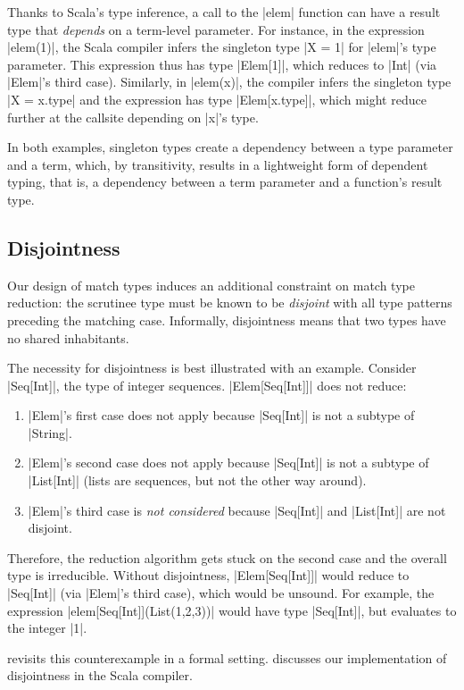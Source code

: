 Thanks to Scala's type inference, a call to the |elem| function can have a result type that \emph{depends} on a term-level parameter.
For instance, in the expression |elem(1)|, the Scala compiler infers the singleton type |X = 1| for |elem|'s type parameter.
This expression thus has type |Elem[1]|, which reduces to |Int| (via |Elem|'s third case).
Similarly, in |elem(x)|, the compiler infers the singleton type |X = x.type| and the expression has type |Elem[x.type]|, which might reduce further at the callsite depending on |x|'s type.

In both examples, singleton types create a dependency between a type parameter and a term, which, by transitivity, results in a lightweight form of dependent typing, that is, a dependency between a term parameter and a function's result type.

\subsection{Disjointness}
Our design of match types induces an additional constraint on match type reduction: the scrutinee type must be known to be \emph{disjoint} with all type patterns preceding the matching case. Informally, disjointness means that two types have no shared inhabitants.

The necessity for disjointness is best illustrated with an example. Consider |Seq[Int]|, the type of integer sequences. |Elem[Seq[Int]]| does not reduce:
\begin{enumerate}
  \item |Elem|'s first case does not apply because |Seq[Int]| is not a subtype of |String|.
  \item |Elem|'s second case does not apply because |Seq[Int]| is not a subtype of |List[Int]| (lists are sequences, but not the other way around).
  \item |Elem|'s third case is \emph{not considered} because |Seq[Int]| and |List[Int]| are not disjoint.
\end{enumerate}
Therefore, the reduction algorithm gets stuck on the second case and the overall type is irreducible.
Without disjointness, |Elem[Seq[Int]]| would reduce to |Seq[Int]| (via |Elem|'s third case), which would be unsound. For example, the expression |elem[Seq[Int]](List(1,2,3))| would have type |Seq[Int]|, but evaluates to the integer |1|.

 revisits this counterexample in a formal setting.  discusses our implementation of disjointness in the Scala compiler.

